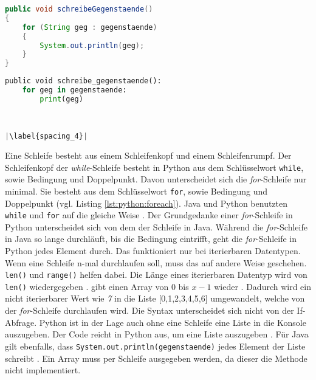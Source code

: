\begin{minipage}{.5\linewidth}
\begin{lstlisting}[language=java,caption={foreach-Schleife Java},captionpos=b,label={lst:java:foreach},frame=none]
public void schreibeGegenstaende()
{
    for (String geg : gegenstaende)
    {
        System.out.println(geg);
    }
}
\end{lstlisting}
\end{minipage}
\begin{minipage}{.5\linewidth}
\begin{lstlisting}[language=python,caption={foreach-Schleife Python},captionpos=b,label={lst:python:foreach},frame=l,escapechar=|]
public void schreibe_gegenstaende():
    for geg in gegenstaende:
        print(geg)
        
        

|\label{spacing_4}|
\end{lstlisting}
\end{minipage}

Eine Schleife besteht aus einem Schleifenkopf und einem Schleifenrumpf. Der Schleifenkopf der \textit{while}-Schleife besteht in Python aus dem Schlüsselwort \texttt{while}, sowie Bedingung und Doppelpunkt. Davon unterscheidet sich die \textit{for}-Schleife nur minimal. Sie besteht aus dem Schlüsselwort \texttt{for}, sowie Bedingung und Doppelpunkt (vgl. Listing \ref{lst:python:foreach}). Java und Python benutzten \texttt{while} und \texttt{for} auf die gleiche Weise \cite{Louis:2010}\cite{Python3:Buch}. Der Grundgedanke einer \textit{for}-Schleife in Python unterscheidet sich von dem der Schleife in Java. Während die \textit{for}-Schleife in Java so lange durchläuft, bis die Bedingung eintrifft, geht die \textit{for}-Schleife in Python jedes Element durch. Das funktioniert nur bei iterierbaren Datentypen. Wenn eine Schleife n-mal durchlaufen soll, muss das auf andere Weise geschehen. \texttt{len()} und \texttt{range()} helfen dabei. Die Länge eines iterierbaren Datentyp wird von \texttt{len()} wiedergegeben \cite{w3school_len}.  gibt einen Array von 0 bis $x-1$ wieder \cite{w3school_range}. Dadurch wird ein nicht iterierbarer Wert wie \textit{7} in die Liste [0,1,2,3,4,5,6] umgewandelt, welche von der \textit{for}-Schleife durchlaufen wird. Die Syntax unterscheidet sich nicht von der If-Abfrage. Python ist in der Lage auch ohne eine Schleife eine Liste in die Konsole auszugeben. Der Code  reicht in Python aus, um eine Liste auszugeben \cite{Python3:Buch}. Für Java gilt ebenfalls, dass \texttt{System.out.println(gegenstaende)} jedes Element der Liste schreibt \cite{Louis:2010}. Ein Array muss per Schleife ausgegeben werden, da dieser die Methode  nicht implementiert.
\par
